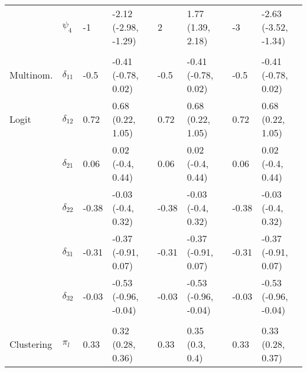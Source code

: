 \documentclass[]{article}
\begin{document}
\begin{table}[t]
\begin{tabular}{llllllll}
\hspace{1em} & $\psi_{4}$ & -1 & -2.12 (-2.98, -1.29) & 2 & 1.77 (1.39, 2.18) & -3 & -2.63 (-3.52, -1.34)\\
\addlinespace[0.3em]
\multicolumn{8}{l}{\textbf{ }}\\
\hspace{1em}Multinom. & $\delta_{11}$ & -0.5 & -0.41 (-0.78, 0.02) & -0.5 & -0.41 (-0.78, 0.02) & -0.5 & -0.41 (-0.78, 0.02)\\
\hspace{1em}Logit & $\delta_{12}$ & 0.72 & 0.68 (0.22, 1.05) & 0.72 & 0.68 (0.22, 1.05) & 0.72 & 0.68 (0.22, 1.05)\\
\hspace{1em} & $\delta_{21}$ & 0.06 & 0.02 (-0.4, 0.44) & 0.06 & 0.02 (-0.4, 0.44) & 0.06 & 0.02 (-0.4, 0.44)\\
\hspace{1em} & $\delta_{22}$ & -0.38 & -0.03 (-0.4, 0.32) & -0.38 & -0.03 (-0.4, 0.32) & -0.38 & -0.03 (-0.4, 0.32)\\
\hspace{1em} & $\delta_{31}$ & -0.31 & -0.37 (-0.91, 0.07) & -0.31 & -0.37 (-0.91, 0.07) & -0.31 & -0.37 (-0.91, 0.07)\\
\hspace{1em} & $\delta_{32}$ & -0.03 & -0.53 (-0.96, -0.04) & -0.03 & -0.53 (-0.96, -0.04) & -0.03 & -0.53 (-0.96, -0.04)\\
\addlinespace[0.3em]
\multicolumn{8}{l}{\textbf{ }}\\
\hspace{1em}Clustering & $\pi_l$ & 0.33 & 0.32 (0.28, 0.36) & 0.33 & 0.35 (0.3, 0.4) & 0.33 & 0.33 (0.28, 0.37)\\
\bottomrule
\end{tabular}
\end{table}
\end{document}
